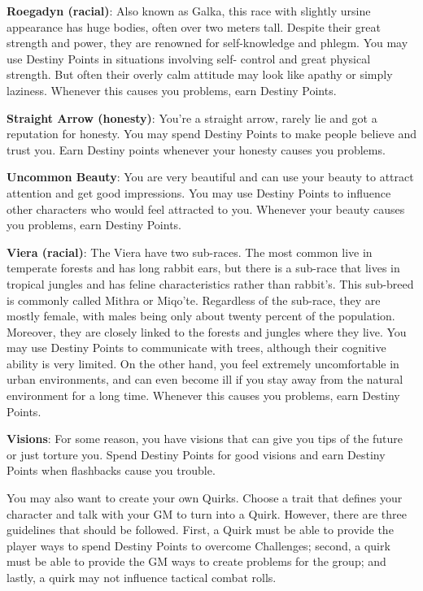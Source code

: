 \begin{multicols}{2}
\textbf{Roegadyn (racial)}: Also known as Galka,
this race with slightly
ursine appearance has
huge bodies, often over
two meters tall. Despite
their great strength and
power, they are renowned
for self-knowledge and
phlegm. You may use
Destiny Points in
situations involving self-
control and great physical
strength. But often their
overly calm attitude may look like apathy or
simply laziness. Whenever this causes you
problems, earn Destiny Points.

\textbf{Straight Arrow (honesty)}: You're a
straight arrow, rarely lie and got a reputation for
honesty. You may spend Destiny Points to make
people believe and trust you. Earn Destiny points
whenever your honesty causes you problems.

\textbf{Uncommon Beauty}: You are very
beautiful and can use your beauty to attract
attention and get good impressions. You may use
Destiny Points to influence other characters who
would feel attracted to you. Whenever your beauty
causes you problems, earn Destiny Points.

\textbf{Viera (racial)}:
The Viera have two sub-races. The most common
live in temperate forests
and has long rabbit ears,
but there is a sub-race that
lives in tropical jungles
and has feline characteristics rather than
rabbit’s. This sub-breed is
commonly called Mithra
or Miqo'te. Regardless of
the sub-race, they are
mostly female, with males
being only about twenty percent of the population.
Moreover, they are closely linked to the forests and
jungles where they live. You may use Destiny
Points to communicate with trees, although their
cognitive ability is very limited. On the other hand,
you feel extremely uncomfortable in urban
environments, and can even become ill if you stay
away from the natural environment for a long time.
Whenever this causes you problems, earn Destiny
Points.

\textbf{Visions}: For some reason, you have visions
that can give you tips of the future or just torture
you. Spend Destiny Points for good visions and
earn Destiny Points when flashbacks cause you
trouble.

You may also want to create your own
Quirks. Choose a trait that defines your character
and talk with your GM to turn into a Quirk.
However, there are three guidelines that should
be followed. First, a Quirk must be able to
provide the player ways to spend Destiny Points
to overcome Challenges; second, a quirk must be
able to provide the GM ways to create problems
for the group; and lastly, a quirk may not
influence tactical combat rolls.
\end{multicols}

